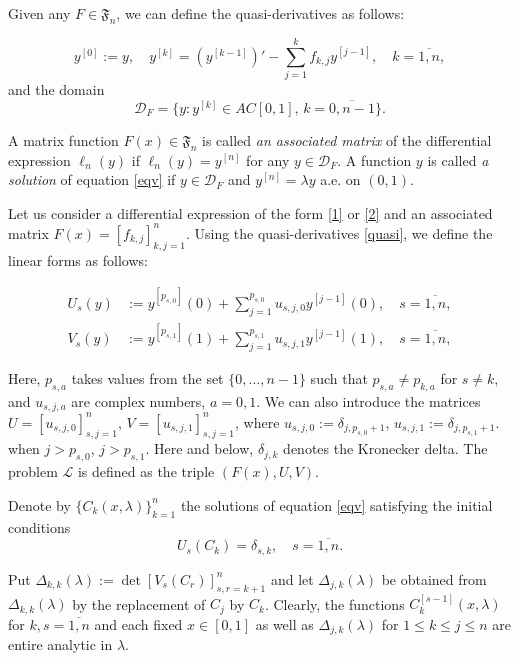 \documentclass[reqno,12pt,centertags]{amsart}
\numberwithin{equation}{section}
\theoremstyle{definition}
\begin{document}
	Given any $F \in \mathfrak F_n$, we can define the quasi-derivatives as follows:
	
	\begin{equation} \label{quasi}
		y^{[0]} := y, \quad y^{[k]} = (y^{[k-1]})' - \sum_{j = 1}^k f_{k,j} y^{[j-1]}, \quad k = \overline{1,n},
	\end{equation}
and the domain
$$
\mathcal D_F = \{ y \colon y^{[k]} \in AC[0,1], \, k = \overline{0, n-1} \}.
$$
	
A matrix function $F(x) \in \mathfrak F_n$ is called \textit{an associated matrix} of the differential expression $\ell_n(y)$ if $\ell_n(y) = y^{[n]}$ for any $y \in \mathcal D_F$.  A function $y$ is called \textit{a solution} of equation \eqref{eqv} if $y \in \mathcal D_F$ and $y^{[n]} = \lambda y$ a.e. on $(0,1)$.
	
	Let us consider a differential expression of the form \eqref{1} or \eqref{2} and an associated matrix $F(x) = [f_{k,j}]_{k,j = 1}^n$. Using the quasi-derivatives \eqref{quasi}, we define the linear forms as follows:
	
	\begin{align} \label{defU}
		U_{s}(y) & := y^{[p_{s,0}]}(0) + \sum_{j = 1}^{p_{s,0}} u_{s,j,0} y^{[j-1]}(0), \quad s = \overline{1,n},\\  \label{defV}
	V_{s}(y) & := y^{[p_{s,1}]}(1) + \sum_{j = 1}^{p_{s,1}} u_{s,j,1} y^{[j-1]}(1), \quad s = \overline{1,n},
    \end{align}
	
	Here, $p_{s,a}$ takes values from the set $\{ 0, \ldots, n-1 \}$ such that $p_{s,a} \ne p_{k,a}$ for $s \ne k$, and $u_{s,j,a}$ are complex numbers, $a=0,1$. We can also introduce the matrices $U=[u_{s,j,0}]_{s,j = 1}^n$, $V=[u_{s,j,1}]_{s,j = 1}^n$, where $u_{s,j,0} := \delta_{j,p_{s,0} + 1}$, $u_{s,j,1} := \delta_{j,p_{s,1} + 1}$. when $j > p_{s,0}$, $j > p_{s,1}$. Here and below, $\delta_{j,k}$ denotes the Kronecker delta. The problem $\mathcal L$ is defined as the triple $(F(x), U, V)$.
	
	Denote by $\{ C_k(x,\lambda) \}_{k = 1}^n$ the solutions of equation \eqref{eqv} satisfying the initial conditions
	$$
	U_{s} (C_k) = \delta_{s,k}, \quad s = \overline{1,n}.
	$$
	
	Put $\Delta_{k,k}(\lambda) := \det[V_{s}(C_r)]_{s,r = k + 1}^n$ and let $\Delta_{j,k}(\lambda)$ be obtained from $\Delta_{k,k}(\lambda)$ by the replacement of $C_j$ by $C_k$. Clearly, the functions $C_k^{[s-1]}(x, \lambda)$ for $k, s = \overline{1,n}$ and each fixed $x \in [0,1]$ as well as $\Delta_{j,k}(\lambda)$ for $1 \le k \le j \le n$ are entire analytic in $\lambda$.
	
\end{document}
